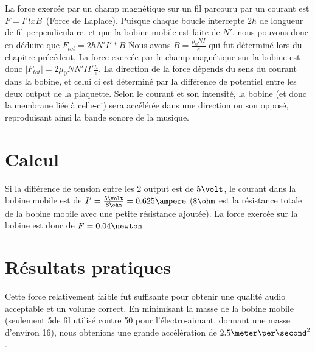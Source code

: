 La force exercée par un champ magnétique sur un fil parcouru par un courant est $F =  I' l x B$\, (Force de Laplace). Puisque 
chaque boucle intercepte $2h$ de longueur de fil perpendiculaire, et que la bobine mobile est faite de $N'$, nous pouvons
donc en déduire que $F_{tot} = 2h N' I' * B$ \. Nous avons $B = \frac{\mu_0 N I}{e}$ qui fut déterminé 
lors du chapitre précédent. La force exercée par le champ magnétique sur la bobine est donc 
$ |F_{tot}| = 2 \mu_0 N N' I I' \frac{h}{e}$. La direction de la force dépends du sens du courant dans la bobine, et 
celui ci est déterminé par la différence de potentiel entre les deux output de la plaquette. Selon le courant et son
intensité, la bobine (et donc la membrane liée à celle-ci) sera accélérée dans une direction ou son opposé, reproduisant 
ainsi la bande sonore de la musique.
\section{Calcul}
Si la différence de tension entre les 2 output est de $5\volt$, le courant dans la bobine mobile est de 
$I' = \frac{5\volt}{8\ohm} = 0.625\ampere$ ($8\ohm$ est la résistance totale de la bobine mobile avec une petite 
résistance ajoutée). La force exercée sur la bobine est donc de $F = 0.04 \newton$
\section{Résultats pratiques}
Cette force relativement faible fut suffisante pour obtenir une qualité audio acceptable et un volume correct. 
En minimisant la masse de la bobine mobile (seulement 5\meter de fil utilisé contre 50 pour l'électro-aimant, 
donnant une masse d'environ 16\gram), nous obtenions une grande accélération de $2.5\meter\per\second^2$. 
